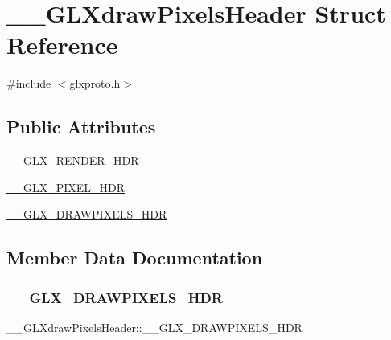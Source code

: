 \hypertarget{struct_____g_l_xdraw_pixels_header}{}\section{\+\_\+\+\_\+\+G\+L\+Xdraw\+Pixels\+Header Struct Reference}
\label{struct_____g_l_xdraw_pixels_header}


{\ttfamily \#include $<$glxproto.\+h$>$}

\subsection*{Public Attributes}
\begin{DoxyCompactItemize}
\item 
\hyperlink{struct_____g_l_xdraw_pixels_header_ade6d9f4cfe8c54c49ab554311977367a}{\+\_\+\+\_\+\+G\+L\+X\+\_\+\+R\+E\+N\+D\+E\+R\+\_\+\+H\+DR}
\item 
\hyperlink{struct_____g_l_xdraw_pixels_header_a7538fe2b4a734a0fa3d763d7a1dedfc2}{\+\_\+\+\_\+\+G\+L\+X\+\_\+\+P\+I\+X\+E\+L\+\_\+\+H\+DR}
\item 
\hyperlink{struct_____g_l_xdraw_pixels_header_ade6b622ef4c71b5cee8ff3c4d5da0f52}{\+\_\+\+\_\+\+G\+L\+X\+\_\+\+D\+R\+A\+W\+P\+I\+X\+E\+L\+S\+\_\+\+H\+DR}
\end{DoxyCompactItemize}


\subsection{Member Data Documentation}
\mbox{\label{struct_____g_l_xdraw_pixels_header_ade6b622ef4c71b5cee8ff3c4d5da0f52}} 
\subsubsection{\texorpdfstring{\+\_\+\+\_\+\+G\+L\+X\+\_\+\+D\+R\+A\+W\+P\+I\+X\+E\+L\+S\+\_\+\+H\+DR}{\_\_GLX\_DRAWPIXELS\_HDR}}
{\footnotesize\ttfamily \+\_\+\+\_\+\+G\+L\+Xdraw\+Pixels\+Header\+::\+\_\+\+\_\+\+G\+L\+X\+\_\+\+D\+R\+A\+W\+P\+I\+X\+E\+L\+S\+\_\+\+H\+DR}

